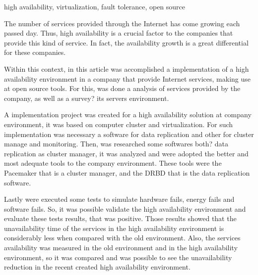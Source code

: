 \begin{englishabstract}{}{high availability, virtualization, fault tolerance, open source}

The number of services provided through the Internet has come growing each passed day. Thus, high availability is a crucial factor to the 
companies that provide this kind of service. In fact, the availability growth is a great differential for these companies.

Within this context, in this article was accomplished a implementation of a high availability environment in a company that provide 
Internet services, making use at open source tools. For this, was done a analysis of services provided by the company, 
as well as a survey? its servers environment.

A implementation project was created for a high availability solution at company environment, it was based on computer cluster and virtualization.
For such implementation was necessary a software for data replication and other for cluster manage and monitoring. Then, was researched
some softwares both? data replication as cluster manager, it was analyzed and were adopted the better and most adequate tools to the company 
environment. These tools were the Pacemaker that is a cluster manager, and the DRBD that is the data replication software.

Lastly were executed some tests to simulate hardware fails, energy fails and software fails. So, it was possible validate the high availability
environment and evaluate these tests results, that was positive. Those results showed that the unavailability time of the services in the
high availability environment is considerably less when compared with the old environment. Also, the services availability was measured in
the old environment and in the high availability environment, so it was compared and was possible to see the unavailability reduction in the 
recent created high availability environment.

\end{englishabstract}
